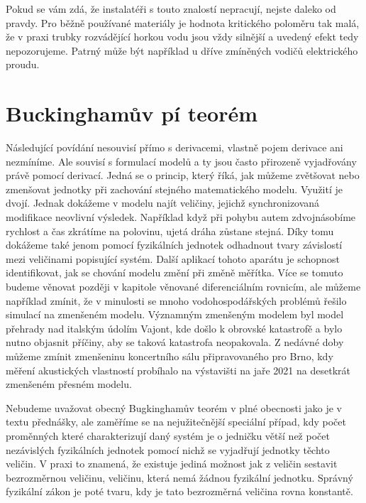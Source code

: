 \documentclass[12pt]{article}
\begin{document}
Pokud se vám zdá, že instalatéři s touto znalostí nepracují, nejste daleko od pravdy. Pro běžně používané materiály je hodnota kritického poloměru tak malá, že v praxi trubky rozvádějící horkou vodu jsou vždy silnější a uvedený efekt tedy nepozorujeme. Patrný může být například u dříve zmíněných vodičů elektrického proudu. 




\section*{Buckinghamův pí teorém}

Následující povídání nesouvisí přímo s derivacemi, vlastně pojem derivace ani nezmíníme. Ale souvisí s formulací modelů a ty jsou často přirozeně vyjadřovány právě pomocí derivací. Jedná se o princip, který říká, jak můžeme zvětšovat nebo zmenšovat jednotky při zachování stejného matematického modelu. Využití je dvojí. Jednak dokážeme v modelu najít veličiny, jejichž synchronizovaná modifikace neovlivní výsledek. Například když při pohybu autem zdvojnásobíme rychlost a čas zkrátíme na polovinu, ujetá dráha zůstane stejná. Díky tomu dokážeme také jenom pomocí fyzikálních jednotek odhadnout tvary závislostí mezi veličinami popisující systém. Další aplikací tohoto aparátu je schopnost identifikovat, jak se chování modelu změní při změně měřítka. Více se tomuto budeme věnovat později v kapitole věnované diferenciálním rovnicím, ale můžeme například zmínit, že v minulosti se mnoho vodohospodářských problémů řešilo simulací na zmenšeném modelu. Významným zmenšeným modelem byl model přehrady nad italským údolím Vajont, kde došlo k obrovské katastrofě a bylo nutno objasnit příčiny, aby se taková katastrofa neopakovala. Z nedávné doby můžeme zmínit zmenšeninu koncertního sálu připravovaného pro Brno, kdy měření akustických vlastností probíhalo na výstavišti na jaře 2021 na desetkrát zmenšeném přesném modelu.

Nebudeme uvažovat obecný Bugkinghamův teorém v plné obecnosti jako je v textu přednášky, ale zaměříme se na nejužitečnější speciální případ, kdy počet proměnných které charakterizují daný systém je o jedničku větší než počet nezávislých fyzikálních jednotek pomocí nichž se vyjadřují jednotky těchto veličin. V praxi to znamená, že existuje jediná možnost jak z veličin sestavit bezrozměrnou veličinu, veličinu, která nemá žádnou fyzikální jednotku. Správný fyzikální zákon je poté tvaru, kdy je tato bezrozměrná veličina rovna konstantě.
\end{document}
